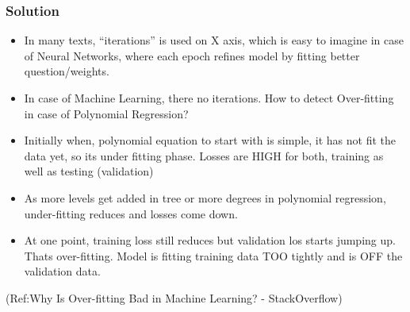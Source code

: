 \begin{frame}[fragile]\frametitle{Solution}

	\begin{itemize}
	\item In many texts, ``iterations'' is used on X axis, which is easy to imagine in case of Neural Networks, where each epoch refines model by fitting better question/weights.
	\item In case of Machine Learning, there no iterations. How to detect Over-fitting in case of Polynomial Regression?
	\item Initially when, polynomial equation to start with is simple, it has not fit the data yet, so its under fitting phase. Losses are HIGH for both, training as well as testing (validation)
	\item As more levels get added in tree or more degrees in polynomial regression, under-fitting reduces and losses come down.
	\item At one point, training loss still reduces but validation los starts jumping up. Thats over-fitting. Model is fitting training data TOO tightly and is OFF the validation data.
	\end{itemize}
	
(Ref:Why Is Over-fitting Bad in Machine Learning? - StackOverflow)
\end{frame}



	


